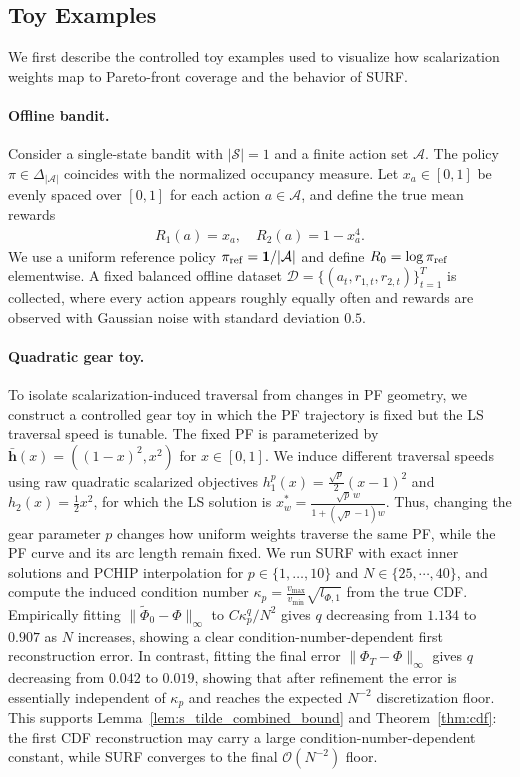 \documentclass{article}
\newcommand{\Farc}{\Phi}
\begin{document}
\subsection{Toy Examples}
\label{app:toy}
We first describe the controlled toy examples used to visualize how scalarization weights map to Pareto-front coverage and the behavior of SURF.
\paragraph{Offline bandit.}
Consider a single-state bandit with $|\mathcal S|=1$ and a finite action set $\mathcal A$. 
The policy $\pi\in\Delta_{|\mathcal A|}$ coincides with the normalized occupancy measure. 
Let $x_a\in[0,1]$ be evenly spaced over $[0,1]$ for each action $a\in\mathcal A$, and define the true mean rewards
\begin{align}
R_1(a)=x_a,
\quad
R_2(a)=1-x_a^4 .
\end{align}
We use a uniform reference policy $\pi_{\rm ref}=\mathbf 1/|\mathcal A|$ and define $R_0=\log \pi_{\rm ref}$ elementwise. 
A fixed balanced offline dataset 
$\mathcal D=\{(a_t,r_{1,t},r_{2,t})\}_{t=1}^T$ is collected, where every action appears roughly equally often and rewards are observed with Gaussian noise with standard deviation $0.5$.

\paragraph{Quadratic gear toy.}
To isolate scalarization-induced traversal from changes in PF geometry, we construct a controlled gear toy in which the PF trajectory is fixed but the LS traversal speed is tunable. The fixed PF is parameterized by $\bar{\mathbf h}(x)=((1-x)^2,x^2)$ for $x\in[0,1]$. We induce different traversal speeds using raw quadratic scalarized objectives $h_1^p(x)=\frac{\sqrt p}{2}(x-1)^2$ and $h_2(x)=\frac12x^2$, for which the LS solution is $x_w^*=\frac{\sqrt p\,w}{1+(\sqrt p-1)w}$. Thus, changing the gear parameter $p$ changes how uniform weights traverse the same PF, while the PF curve and its arc length remain fixed. We run SURF with exact inner solutions and PCHIP interpolation for $p\in\{1,\ldots,10\}$ and $N\in\{25,\cdots,40\}$, and compute the induced condition number $\kappa_p=\frac{v_{\max}}{v_{\min}}\sqrt{l_{\Farc,1}}$ from the true CDF. Empirically fitting $\|\tilde\Phi_0-\Phi\|_\infty$ to $C\kappa_p^q/N^2$ gives $q$ decreasing from $1.134$ to $0.907$ as $N$ increases, showing a clear condition-number-dependent first reconstruction error. In contrast, fitting the final error $\|\Phi_T-\Phi\|_\infty$ gives $q$ decreasing from $0.042$ to $0.019$, showing that after refinement the error is essentially independent of $\kappa_p$ and reaches the expected $N^{-2}$ discretization floor. This supports Lemma~\ref{lem:s_tilde_combined_bound} and Theorem~\ref{thm:cdf}: the first CDF reconstruction may carry a large condition-number-dependent constant, while SURF converges to the final $\mathcal{O}(N^{-2})$ floor.
\end{document}
